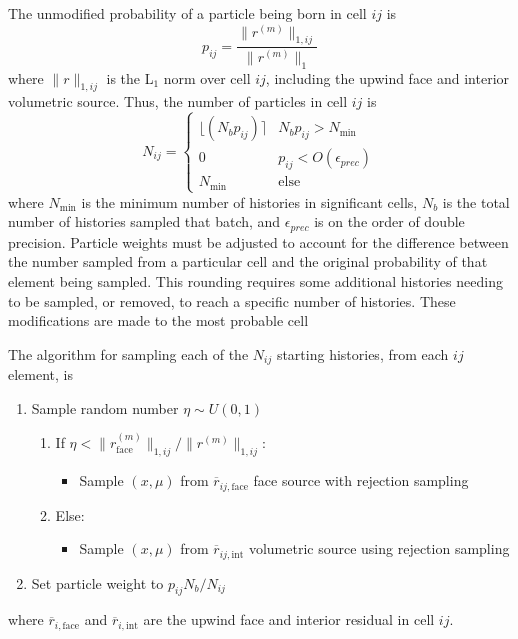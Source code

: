 The unmodified probability of a particle being born in cell $ij$ is 
\begin{equation}
    p_{ij} = \frac{\|r^{(m)}\|_{1,{ij}}}{\|r^{(m)}\|_1}
\end{equation}
where $\|r\|_{1,ij}$ is the L$_1$ norm over cell $ij$, including the upwind face and interior
volumetric source.
Thus, the number of
particles in cell $ij$ is 
\begin{equation}\label{eq:sys_N}
    N_{ij} = 
\left\{\begin{matrix}
    \lfloor(N_bp_{ij})\rceil & N_bp_{ij} > N_{\min}
    \\ 0 & p_{ij} < O(\epsilon_{prec})
\\ N_{\min} & \text{else}
\end{matrix}\right.
\end{equation}
where $N_{\min}$ is the minimum number of histories in significant cells, $N_b$ is the
total number of histories sampled that batch, and
$\epsilon_{prec}$ is on the order of double precision.  
Particle weights must be adjusted to account for
the difference between the number sampled from a particular cell and the original probability
of that element being sampled.  This rounding requires some additional histories
needing to be sampled, or removed, to reach a specific number of histories.  These
modifications are made to the most probable cell

The algorithm for sampling each of the $N_{ij}$ starting histories, from each $ij$ element, is
\begin{enumerate}
    \item Sample random number $\eta\sim U(0,1)$ 
    \begin{enumerate}
        \item If $\eta < \|r^{(m)}_{\text{face}}\|_{1,ij}/\|r^{(m)}\|_{1,ij}$:
            \begin{itemize}
                \item Sample $(x,\mu)$ from $\overline r_{ij,\text{face}}$ face source with
                    rejection sampling
            \end{itemize}
        \item Else:
            \begin{itemize}
                \item Sample $(x,\mu)$ from $\overline r_{ij,\text{int}}$ volumetric source
                    using rejection sampling
            \end{itemize}
    \end{enumerate}
\item Set particle weight to $p_{ij}N_b/N_{ij}$
\end{enumerate}
where $\overline r_{i,\text{face}}$ and $\overline r_{i,\text{int}}$ are the upwind face and
interior residual in cell $ij$.

